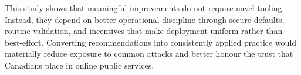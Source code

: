 \documentclass[pdflatex,sn-mathphys-num]{sn-jnl}
\numberwithin{equation}{section}
\theoremstyle{thmstyleone}
\theoremstyle{thmstyletwo}%
\theoremstyle{thmstylethree}%
\begin{document}
\vspace{1em}This study shows that meaningful improvements do not require novel tooling. Instead, they depend on better operational
discipline through secure defaults, routine validation, and incentives that make deployment uniform rather than best-effort.
Converting recommendations into consistently applied practice would materially reduce exposure to common attacks and better
honour the trust that Canadians place in online public services.


\newpage 

\end{document}
